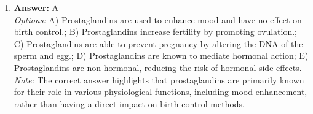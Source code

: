 \documentclass[12pt]{article}
\begin{document}
\begin{enumerate}[label=\arabic*.]
\\ \textit{Note:} Insulin actually promotes the storage of glycogen in the liver and muscle cells, so the statement that insulin decreases storage of glycogen is incorrect.
\item \textbf{Answer:} A
\\ \textit{Options:} A) Prostaglandins are used to enhance mood and have no effect on birth control.; B) Prostaglandins increase fertility by promoting ovulation.; C) Prostaglandins are able to prevent pregnancy by altering the DNA of the sperm and egg.; D) Prostaglandins are known to mediate hormonal action; E) Prostaglandins are non-hormonal, reducing the risk of hormonal side effects.
\\ \textit{Note:} The correct answer highlights that prostaglandins are primarily known for their role in various physiological functions, including mood enhancement, rather than having a direct impact on birth control methods.
\end{enumerate}
\end{document}
